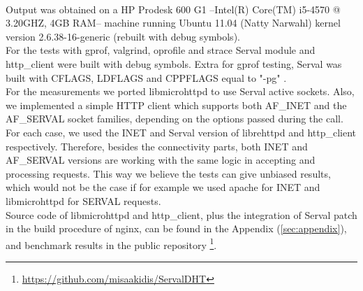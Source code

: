 \paragraph{} Output was obtained on a HP Prodesk 600 G1 --Intel(R) Core(TM) i5-4570 @ 3.20GHZ, 4GB RAM-- machine running Ubuntu 11.04 (Natty Narwahl) kernel version 2.6.38-16-generic (rebuilt with debug symbols).
\\ \indent For the tests with gprof, valgrind, oprofile and strace Serval module and http\_client were built with debug symbols.
Extra for gprof testing, Serval was built with CFLAGS, LDFLAGS and CPPFLAGS equal to "-pg" .
\\ \indent For the measurements we ported libmicrohttpd to use Serval active sockets.
Also, we implemented a simple HTTP client which supports both AF\_INET and the AF\_SERVAL socket families, depending on the options passed during the call.
For each case, we used the INET and Serval version of librehttpd and http\_client respectively.
Therefore, besides the connectivity parts, both INET and AF\_SERVAL versions are working with the same logic in accepting and processing requests.
This way we believe the tests can give unbiased results, which would not be the case if for example we used apache for INET and libmicrohttpd for SERVAL requests.
\\ \indent Source code of libmicrohttpd and http\_client, plus the integration of Serval patch in the build procedure of nginx, can be found in the Appendix (\ref{sec:appendix}), and benchmark results in the public repository \footnote{\url{https://github.com/misaakidis/ServalDHT}}.

\iffalse
gprof
perf
1) memory (oprofile)
2) CPU cycles (callgrind)
3) system calls time (strace)
4) timed execution of 1000 times
5) requests per second
6) Number of packers per request, bytes sent, packet structure
\fi